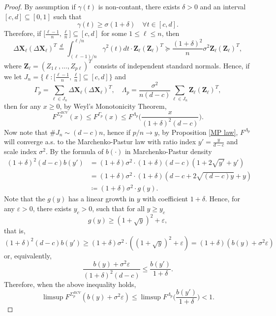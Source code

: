 \documentclass[a4paper,11pt]{book}
\theoremstyle{plain}
\theoremstyle{definition}
\begin{document}
    \begin{proof}
    	By assumption if $\gamma(t)$ is non-contant, there exists $\delta > 0$ and an interval $[c, d] \subseteq [0, 1] $ such that
    	\[ \gamma(t) \geq \sigma(1+\delta) \quad \forall t \in [c, d]. \]
    	Therefore, if $\big[ \frac{\ell - 1}{n}, \frac{\ell}{n} \big] \subseteq [c, d] $ for some $1 \leq \ell \leq n$, then
    	\[ \Delta \mathbf{X}_\ell (\Delta \mathbf{X}_\ell )^T \stackrel{d}{=} \int_{(\ell-1)/n}^{\ell/n} \gamma^2(t) dt \cdot \mathbf{Z}_\ell(\mathbf{Z}_\ell)^T \succeq \frac{(1+\delta)^2}{n} \sigma^2 \mathbf{Z}_\ell(\mathbf{Z}_\ell)^T,  \]
    	where $\mathbf{Z}_\ell = (Z_{1\ell}, \dots , Z_{p\ell})^T$ consists of independent standard normals. Hence, if we let $ J_n = \big\{ \ell: \big[ \frac{\ell - 1}{n}, \frac{\ell}{n} \big] \subseteq [c, d] \big\} $ and
    	\[ \Gamma_p = \sum_{\ell \in J_n} \Delta \mathbf{X}_\ell (\Delta \mathbf{X}_\ell )^T, \quad \Lambda_p = \frac{\sigma^2}{n(d-c)} \sum_{\ell \in J_n} \mathbf{Z}_\ell (\mathbf{Z}_\ell )^T,  \]
    	then for any $x \geq 0$, by Weyl's Monotonicity Theorem,
    	\[
    	F^{\Sigma_p^{RCV}}(x) \leq F^{\Gamma_p}(x) \leq F^{\Lambda_p}\bigg(\frac{x}{(1+\delta)^2(d-c)}\bigg).
    	\]
	    Now note that $\# J_n \sim (d-c)n$, hence if $p/n \rightarrow y$, by Proposition \ref{MP law}, $F^{\Lambda_p}$ will converge a.s. to the Marchenko-Pastur law with ratio index $y'=\frac{y}{d-c}$ and scale index $\sigma^2$.
	    By the formula of $b(\cdot)$ in Marchenko-Pastur density
	    \[
	    \begin{aligned}
	    (1+\delta)^2(d-c)b(y') &=(1+\delta)\sigma^2 \cdot (1+\delta)(d-c)(1+2\sqrt{y'}+y') \\
	    & =(1+\delta)\sigma^2 \cdot (1+\delta)(d-c + 2\sqrt{(d-c)y} + y) \\
	    & \coloneqq (1+\delta)\sigma^2 \cdot  g(y).
	    \end{aligned}
	    \]
	    Note that the $g(y)$ has a linear growth in $y$ with coefficient $1+\delta$. Hence, for any $\varepsilon > 0$, there exists $y_c > 0$, such that for all $y \geq y_c$
	    \[ g(y) \geq (1+\sqrt{y})^2+\varepsilon,  \]
	    that is,
	    \[ (1+\delta)^2(d-c)b(y') \geq (1+\delta) \sigma^2 \cdot ((1+\sqrt{y})^2+\varepsilon) = (1+\delta)(b(y)+\sigma^2\varepsilon)  \]
	    or, equivalently,
	    \[ \frac{b(y) + \sigma^2\varepsilon}{(1+\delta)^2(d-c)} \leq \frac{b(y')}{1+\delta}. \]
	    Therefore, when the above inequality holds,
	    \[\limsup F^{\Sigma_p^{RCV}}(b(y) + \sigma^2\varepsilon) \leq \limsup F^{\Lambda_p}\bigg(\frac{b(y')}{1+\delta}\bigg) < 1. \]
    \end{proof}
    
\end{document}
